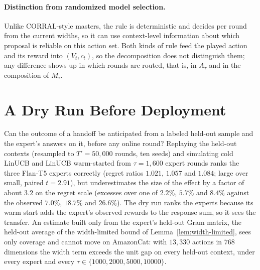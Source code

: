 \documentclass[anon]{alt2027} %
\begin{document}
\paragraph{Distinction from randomized model selection.}
Unlike CORRAL-style masters, the rule is deterministic and decides per round
from the current widths, so it can use context-level information about which
proposal is reliable on this action set. Both kinds of rule feed the played
action and its reward into $(V_t,c_t)$, so the decomposition does not
distinguish them; any difference shows up in which rounds are routed, that
is, in $A_\tau$ and in the composition of $M_\tau$.

\section{A Dry Run Before Deployment}
\label{app:diagnostics}

Can the outcome of a handoff be anticipated from a labeled held-out sample
and the expert's answers on it, before any online round? Replaying the
held-out contexts (resampled to $T'=50{,}000$ rounds, ten seeds) and
simulating cold LinUCB and LinUCB warm-started from $\tau=1{,}600$ expert
rounds ranks the three Flan-T5 experts correctly (regret ratios $1.021$,
$1.057$ and $1.084$; large over small, paired $t=2.91$), but underestimates
the size of the effect by a factor of about $3.2$ on the regret scale
(excesses over one of $2.2\%$, $5.7\%$ and $8.4\%$ against the observed
$7.0\%$, $18.7\%$ and $26.6\%$). The dry run ranks the experts because its
warm start adds the expert's observed rewards to the response sum, so it
sees the transfer. An estimate built only from the expert's held-out Gram
matrix, the held-out average of the width-limited bound of
Lemma~\ref{lem:width-limited}, sees only coverage and cannot move on
AmazonCat: with $13{,}330$ actions in $768$ dimensions the width term exceeds
the unit gap on every held-out context, under every expert and every
$\tau\in\{1000,2000,5000,10000\}$.
\end{document}
